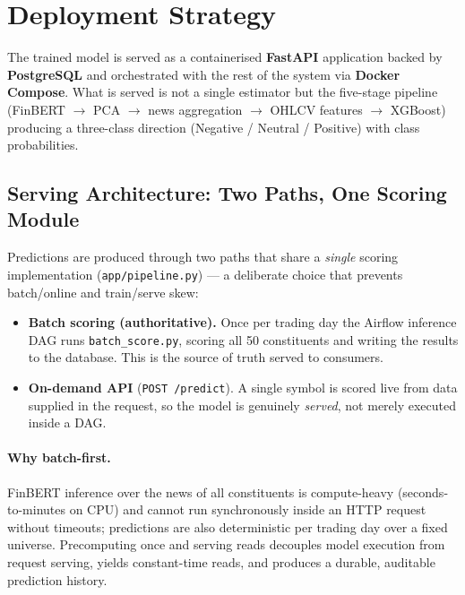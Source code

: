 \documentclass[11pt,a4paper]{article}
\begin{document}
\section{Deployment Strategy}
\label{sec:deployment}

The trained model is served as a containerised \textbf{FastAPI} application
backed by \textbf{PostgreSQL} and orchestrated with the rest of the system via
\textbf{Docker Compose}. What is served is not a single estimator but the
five-stage pipeline (FinBERT $\to$ PCA $\to$ news aggregation $\to$ OHLCV
features $\to$ XGBoost) producing a three-class direction
(Negative / Neutral / Positive) with class probabilities.

\subsection{Serving Architecture: Two Paths, One Scoring Module}

Predictions are produced through two paths that share a \emph{single} scoring
implementation (\texttt{app/pipeline.py}) --- a deliberate choice that prevents
batch/online and train/serve skew:

\begin{itemize}[nosep]
  \item \textbf{Batch scoring (authoritative).} Once per trading day the Airflow
        inference DAG runs \texttt{batch\_score.py}, scoring all 50 constituents
        and writing the results to the database. This is the source of truth
        served to consumers.
  \item \textbf{On-demand API} (\texttt{POST /predict}). A single symbol is
        scored live from data supplied in the request, so the model is genuinely
        \emph{served}, not merely executed inside a DAG.
\end{itemize}

\paragraph{Why batch-first.} FinBERT inference over the news of all constituents
is compute-heavy (seconds-to-minutes on CPU) and cannot run synchronously inside
an HTTP request without timeouts; predictions are also deterministic per trading
day over a fixed universe. Precomputing once and serving reads decouples model
execution from request serving, yields constant-time reads, and produces a
durable, auditable prediction history.
\end{document}
